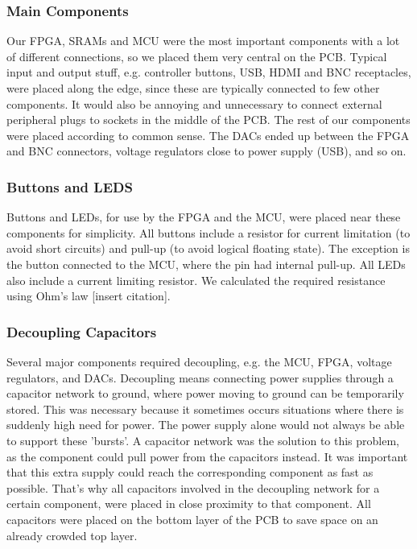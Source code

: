 \subsubsection{Main Components}
Our FPGA, SRAMs and MCU were the most important components with a lot of different connections, so we placed them very central on the PCB. Typical input and output stuff, e.g. controller buttons, USB, HDMI and BNC receptacles, were placed along the edge, since these are typically connected to few other components. It would also be annoying and unnecessary to connect external peripheral plugs to sockets in the middle of the PCB. 
\newline
The rest of our components were placed according to common sense. The DACs ended up between the FPGA and BNC connectors, voltage regulators close to power supply (USB), and so on. 
\subsubsection{Buttons and LEDS}
Buttons and LEDs, for use by the FPGA and the MCU, were placed near these components for simplicity. All buttons include a resistor for current limitation (to avoid short circuits) and pull-up (to avoid logical floating state). The exception is the button connected to the MCU, where the pin had internal pull-up. All LEDs also include a current limiting resistor. We calculated the required resistance using Ohm's law [insert citation].

\subsubsection{Decoupling Capacitors}
Several major components required decoupling, e.g. the MCU, FPGA, voltage regulators, and DACs. Decoupling means connecting power supplies through a capacitor network to ground, where power moving to ground can be temporarily stored. This was necessary because it sometimes occurs situations where there is suddenly high need for power. The power supply alone would not always be able to support these 'bursts'. A capacitor network was the solution to this problem, as the component could pull power from the capacitors instead.
\newline
It was important that this extra supply could reach the corresponding component as fast as possible. That's why all capacitors involved in the decoupling network for a certain component, were placed in close proximity to that component. All capacitors were placed on the bottom layer of the PCB to save space on an already crowded top layer.

